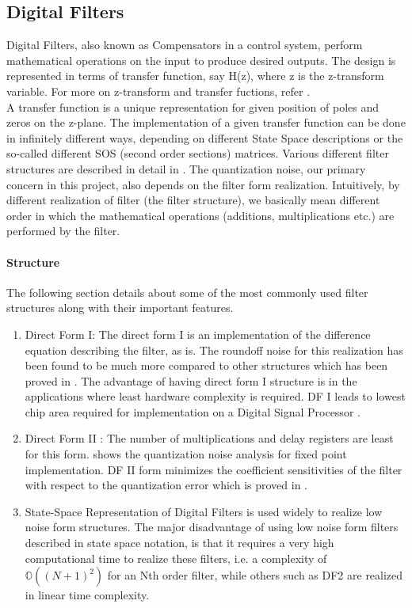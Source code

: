 \documentclass[a4paper,12pt]{article}
\begin{document}
    \subsection{Digital Filters}
    Digital Filters, also known as Compensators in a control system, perform mathematical operations on the input to produce desired outputs. The design is represented in terms of transfer function, say H(z), where z is the z-transform variable. For more on z-transform and transfer fuctions, refer \cite{Z transform}. \\
    A transfer function is a unique representation for given position of poles and zeros on the z-plane. The implementation of a given transfer function can be done in infinitely different ways, depending on different State Space descriptions or the so-called different SOS (second order sections) matrices. Various different filter structures are described in detail in \cite{Oppenheim}. The quantization noise, our primary concern in this project, also depends on the filter form realization. Intuitively, by different realization of filter (the filter structure), we basically mean different order in which the mathematical operations (additions, multiplications etc.) are performed by the filter. 
    \paragraph{Structure}
The following section details about some of the most commonly used filter structures along with their important features.
		\begin{enumerate}
		\item Direct Form I: The direct form I is an implementation of the difference equation describing the filter, as is. The roundoff noise for this realization has been found to be much more compared to other structures which has been proved in \cite{Oppenheim}. The advantage of having direct form I structure is in the applications where least hardware complexity is required. DF I leads to lowest chip area required for implementation on a Digital Signal Processor \cite{Rahmanian}.
		\item Direct Form II : The number of multiplications and delay registers are least for this form. \cite{Oppenheim} shows the quantization noise analysis for fixed point implementation. DF II form minimizes the coefficient sensitivities of the filter with respect to the quantization error which is proved in \cite{Rahmanian}.
		\item State-Space Representation of Digital Filters is used widely to realize low noise form structures. The major disadvantage of using low noise form filters described in state space notation, is that it requires a very high computational time to realize these filters, i.e. a complexity of $\mathbb{O}((N+1)^{2})$ for an Nth order filter\cite{T L Chang}, while others such as DF2 are realized in linear time complexity.
		\end{enumerate}
	    
\end{document}
